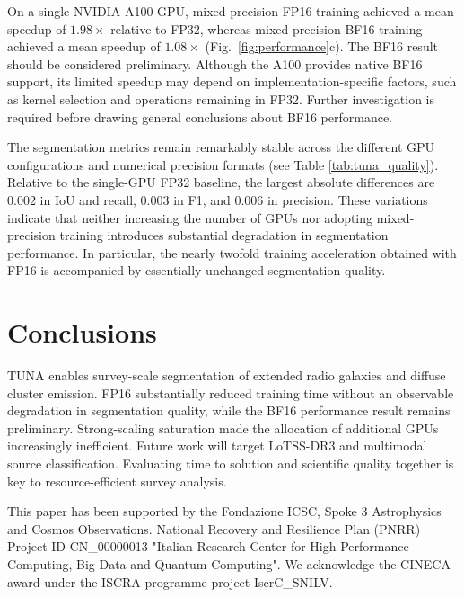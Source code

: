 \documentclass[11pt,twoside]{article}
\begin{document}

On a single NVIDIA A100 GPU, mixed-precision FP16 training achieved a mean
speedup of $1.98\times$ relative to FP32, whereas mixed-precision BF16
training achieved a mean speedup of $1.08\times$
(Fig.~\ref{fig:performance}c). The BF16 result should be considered
preliminary. Although the A100 provides native BF16 support, its limited
speedup may depend on implementation-specific factors, such as kernel
selection and operations remaining in FP32. Further investigation is required
before drawing general conclusions about BF16 performance.

The segmentation metrics remain remarkably stable across the different GPU configurations and numerical precision formats (see Table \ref{tab:tuna_quality}). Relative to the single-GPU FP32 baseline, the largest absolute differences are 0.002 in IoU and recall, 0.003 in F1, and 0.006 in precision. These variations indicate that neither increasing the number of GPUs nor adopting mixed-precision training introduces substantial degradation in segmentation performance. In particular, the nearly twofold training acceleration obtained with FP16 is accompanied by essentially unchanged segmentation quality.

\section{Conclusions}

TUNA enables survey-scale segmentation of extended radio galaxies
and diffuse cluster emission. FP16
substantially reduced training time without an observable degradation in segmentation quality, while the BF16 performance result remains
preliminary. Strong-scaling saturation
made the allocation of additional GPUs increasingly inefficient. Future work will target
LoTSS-DR3 and multimodal source classification. Evaluating time to solution
and scientific quality together is key to resource-efficient survey analysis.



\acknowledgements This paper has been supported by the Fondazione ICSC, Spoke 3 Astrophysics and Cosmos Observations. National Recovery and Resilience Plan (PNRR) Project ID CN\_00000013 "Italian Research Center for High-Performance Computing, Big Data and Quantum Computing". We acknowledge the CINECA award under the ISCRA programme project IscrC\_SNILV.


\end{document}
